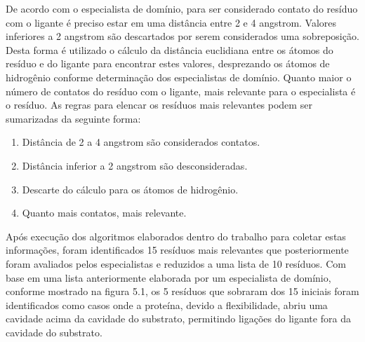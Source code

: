 De acordo com o especialista de domínio, para ser considerado contato do resíduo com o ligante é preciso estar em uma distância entre 2 e 4 angstrom. Valores inferiores a 2 angstrom são descartados por serem considerados uma sobreposição. Desta forma é utilizado o cálculo da distância euclidiana entre os átomos do resíduo e do ligante \cite{KARANADUNOSM09} para encontrar estes valores, desprezando os átomos de hidrogênio conforme determinação dos especialistas de domínio. Quanto maior o número de contatos do resíduo com o ligante, mais relevante para o especialista é o resíduo. As regras para elencar os resíduos mais relevantes podem ser sumarizadas da seguinte forma:

\begin{enumerate}
    \item Distância de 2 a 4 angstrom são considerados contatos.
    \item Distância inferior a 2 angstrom são desconsideradas. 
    \item Descarte do cálculo para os átomos de hidrogênio.
    \item Quanto mais contatos, mais relevante.
\end{enumerate}

Após execução dos algoritmos elaborados dentro do trabalho para coletar estas informações, foram identificados 15 resíduos mais relevantes que posteriormente foram avaliados pelos especialistas e reduzidos a uma lista de 10 resíduos. Com base em uma lista anteriormente elaborada por um especialista de domínio, conforme mostrado na figura 5.1, os 5 resíduos que sobraram dos 15 iniciais foram identificados como casos onde a proteína, devido a flexibilidade, abriu uma cavidade acima da cavidade do substrato, permitindo ligações do ligante fora da cavidade do substrato.

